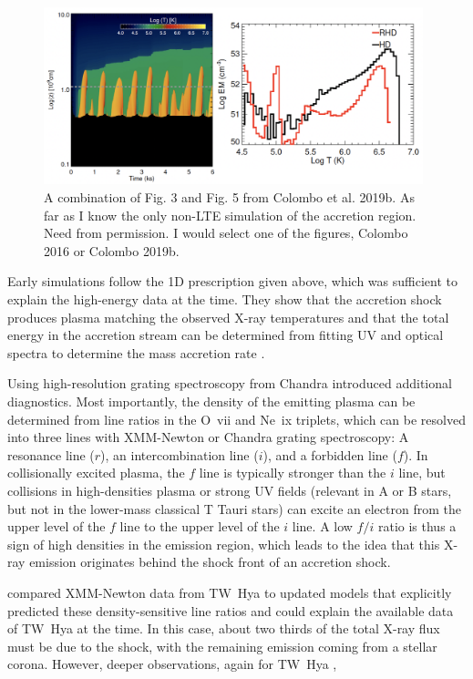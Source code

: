 \begin{figure}
    \centering
    \includegraphics[width=11cm]{figs/colombo2019b.png}
    \caption{A combination of Fig. 3 and Fig. 5 from Colombo et al. 2019b. As far as I know the only non-LTE simulation of the accretion region. Need from permission. I would select one of the figures, Colombo 2016 or Colombo 2019b.}
    \label{fig:colombo2016}
\end{figure}

Early simulations follow the 1D prescription given above, which was sufficient to explain the high-energy data at the time. They show that the accretion shock produces plasma matching the observed X-ray temperatures \citep{lamzin_1998} and that the total energy in the accretion stream can be determined from fitting UV and optical spectra to determine the mass accretion rate \citep{calvet_1998}.

Using high-resolution grating spectroscopy from Chandra \citet{Kastner_2002} introduced additional diagnostics. Most importantly, the density of the emitting plasma can be determined from line ratios in the O~{\sc vii} and Ne~{\sc ix} triplets, which can be resolved into three lines with XMM-Newton or Chandra grating spectroscopy: A resonance line ($r$), an intercombination line ($i$), and a forbidden line ($f$). In collisionally excited plasma, the $f$ line is typically stronger than the $i$ line, but collisions in high-densities plasma or strong UV fields (relevant in A or B stars, but not in the lower-mass classical T Tauri stars) can excite an electron from the upper level of the $f$ line to the upper level of the $i$ line. A low $f/i$ ratio is thus a sign of high densities in the emission region, which leads to the idea that this X-ray emission originates behind the shock front of an accretion shock.

\citet{Guenther_2007} compared XMM-Newton data from TW~Hya to updated models that explicitly predicted these density-sensitive line ratios and could explain the available data of TW~Hya at the time. In this case, about two thirds of the total X-ray flux must be due to the shock, with the remaining emission coming from a stellar corona. However, deeper observations, again for TW~Hya \cite{Brickhouse_2010}, 

